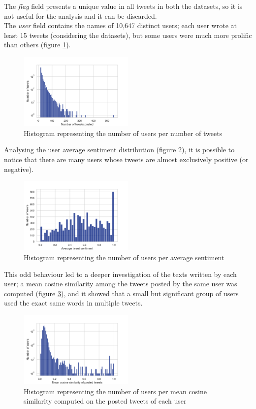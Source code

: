 \documentclass[conference]{IEEEtran}
\begin{document}
The \textit{flag} field presents a unique value in all tweets in both the datasets, so it is not useful for the analysis and it can be discarded. \\
The \textit{user} field contains the names of 10,647 distinct users; each user wrote at least 15 tweets (considering the datasets), but some users were much more prolific than others (figure \ref{fig:user_per_tweet}).
\begin{figure}
    \includegraphics[width=0.5\textwidth]{user_per_tweet}
    \caption[Histogram of users per tweets]{Histogram representing the number of users per number of tweets}
    \label{fig:user_per_tweet}
\end{figure}
Analysing the user average sentiment distribution (figure \ref{fig:average_user_sentiment}), it is possible to notice that there are many users whose tweets are almost exclusively positive (or negative).
\begin{figure}
    \includegraphics[width=0.5\textwidth]{average_user_sentiment}
    \caption[User average sentiment]{Histogram representing the number of users per average sentiment}
    \label{fig:average_user_sentiment}
\end{figure}
This odd behaviour led to a deeper investigation of the texts written by each user; a mean cosine similarity among the tweets posted by the same user was computed (figure \ref{fig:internal_similarity_users}), and it showed that a small but significant group of users used the exact same words in multiple tweets.  
\begin{figure}
    \includegraphics[width=0.5\textwidth]{internal_similarity_users}
    \caption[Mean cosine similarity]{Histogram representing the number of users per mean cosine similarity computed on the posted tweets of each user}
    \label{fig:internal_similarity_users}
\end{figure}
\end{document}

